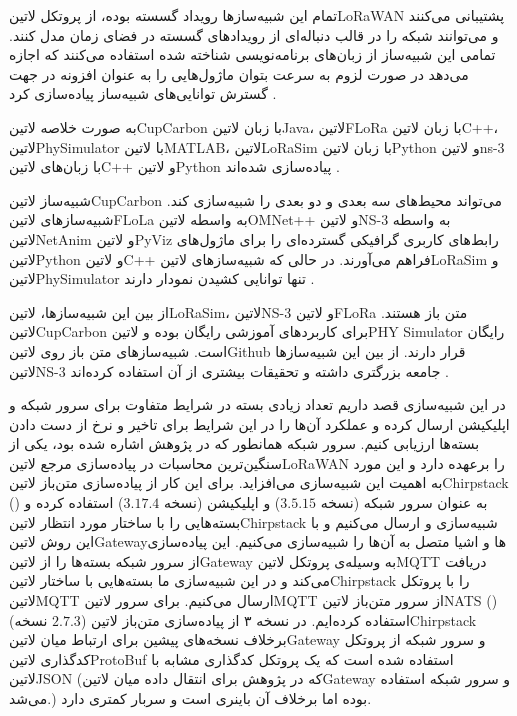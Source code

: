تمام این شبیه‌سازها رویداد گسسته بوده، از پروتکل ‌لاتین{LoRaWAN} پشتیبانی می‌کنند و می‌توانند شبکه را در قالب
دنباله‌ای از رویدادهای گسسته در فضای زمان مدل کنند.
تمامی این شبیه‌ساز از زبان‌های برنامه‌نویسی شناخته شده استفاده می‌کنند که اجازه می‌دهد در صورت لزوم به سرعت بتوان
ماژول‌هایی را به عنوان افزونه در جهت گسترش توانایی‌های شبیه‌ساز پیاده‌سازی کرد
.

به صورت خلاصه ‌لاتین{CupCarbon} با زبان ‌لاتین{Java}، ‌لاتین{FLoRa} با زبان ‌لاتین{C++}،
‌لاتین{PhySimulator} با ‌لاتین{MATLAB}، ‌لاتین{LoRaSim} با زبان ‌لاتین{Python}
و ‌لاتین{ns-3} با زبان‌های ‌لاتین{C++} و ‌لاتین{Python} پیاده‌سازی شده‌اند
.

شبیه‌ساز ‌لاتین{CupCarbon} می‌تواند محیط‌های سه بعدی و دو بعدی را شبیه‌سازی کند.
شبیه‌سازهای ‌لاتین{FLoLa} به واسطه ‌لاتین{OMNet++} و ‌لاتین{NS-3} به واسطه
‌لاتین{NetAnim} و ‌لاتین{PyViz} رابط‌های کاربری گرافیکی گسترده‌ای را برای ماژول‌های ‌لاتین{Python}
و ‌لاتین{C++} فراهم می‌آورند.
در حالی که شبیه‌سازهای ‌لاتین{LoRaSim} و ‌لاتین{PhySimulator} تنها توانایی کشیدن نمودار دارند
.

از بین این شبیه‌سازها، ‌لاتین{LoRaSim}، ‌لاتین{NS-3} و ‌لاتین{FLoRa} متن باز هستند.
‌لاتین{CupCarbon} برای کاربردهای آموزشی رایگان بوده و ‌لاتین{PHY Simulator} رایگان است.
شبیه‌سازهای متن‌ باز روی ‌لاتین{Github} قرار دارند. از بین این شبیه‌سازها ‌لاتین{NS-3}
جامعه بزرگتری داشته و تحقیقات بیشتری از آن استفاده کرده‌اند
.


در این شبیه‌سازی قصد داریم تعداد زیادی بسته در شرایط متفاوت برای سرور شبکه و اپلیکیشن ارسال کرده و عملکرد آن‌ها را در این شرایط برای تاخیر و نرخ از دست دادن بسته‌ها ارزیابی کنیم.
سرور شبکه همانطور که در پژوهش  اشاره شده بود، یکی از سنگین‌ترین محاسبات در پیاده‌سازی مرجع ‌لاتین{LoRaWAN} را برعهده دارد و این مورد به
اهمیت این شبیه‌سازی می‌افزاید.
برای این کار از پیاده‌سازی متن‌باز ‌لاتین{Chirpstack} () به عنوان سرور شبکه (نسخه $3.5.15$) و اپلیکیشن (نسخه $3.17.4$) استفاده کرده و بسته‌هایی را با ساختار مورد انتظار
‌لاتین{Chirpstack} شبیه‌سازی و ارسال می‌کنیم و با این روش ‌لاتین{Gateway}ها و اشیا متصل به آن‌ها را شبیه‌سازی می‌کنیم.
این پیاده‌سازی از سرور شبکه بسته‌ها را از ‌لاتین{Gateway} به وسیله‌ی پروتکل ‌لاتین{MQTT} دریافت می‌کند و در این شبیه‌سازی ما بسته‌هایی با ساختار ‌لاتین{Chirpstack}
را با پروتکل ‌لاتین{MQTT} ارسال می‌کنیم. برای سرور ‌لاتین{MQTT} از سرور متن‌باز ‌لاتین{NATS} () (نسخه $2.7.3$) استفاده کرده‌ایم.
در نسخه ۳ از پیاده‌سازی متن‌باز ‌لاتین{Chirpstack} برخلاف نسخه‌های پیشین برای ارتباط میان ‌لاتین{Gateway} و سرور شبکه از پروتکل کدگذاری ‌لاتین{ProtoBuf} استفاده شده است که یک پروتکل
کدگذاری مشابه با ‌لاتین{JSON} (که در پژوهش  برای انتقال داده میان ‌لاتین{Gateway} و سرور شبکه استفاده می‌شد.) بوده اما برخلاف آن باینری است و سربار کمتری دارد.

